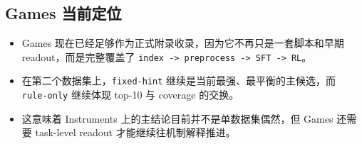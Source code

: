 \documentclass[11pt,a4paper]{ctexart}
\begin{document}
\subsection{Games 当前定位}

\begin{itemize}
\item Games 现在已经足够作为正式附录收录，因为它不再只是一套脚本和早期 readout，而是完整覆盖了 \texttt{index -> preprocess -> SFT -> RL}。
\item 在第二个数据集上，\texttt{fixed-hint} 继续是当前最强、最平衡的主候选，而 \texttt{rule-only} 继续体现 top-10 与 coverage 的交换。
\item 这意味着 Instruments 上的主结论目前并不是单数据集偶然，但 Games 还需要 task-level readout 才能继续往机制解释推进。
\end{itemize}

\appendix


\end{document}
